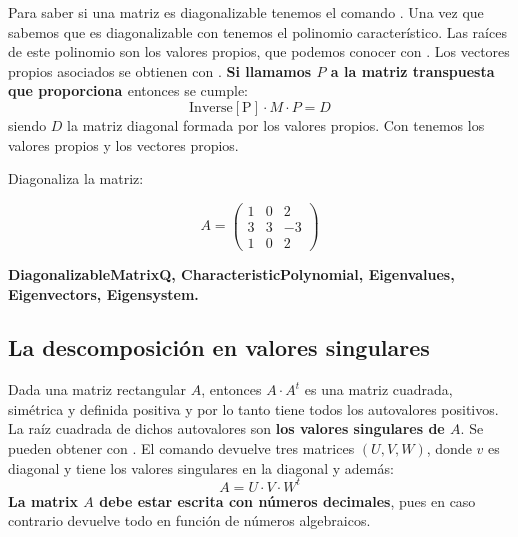 \documentclass[a4paper,10pt, draft]{article}
\newcommand{\com}[1]{\textbf{\color{blue}{#1}}}
\newenvironment{ejer}{\begin{tcolorbox}[center title, title=Ejercicios,
fonttitle=\sffamily\bfseries,colback=blue!5,colframe=orange]}{\end{tcolorbox}}
\newenvironment{funciones}{\begin{tcolorbox}[center title, title=Nuevas funciones, fonttitle=\sffamily\bfseries, colback=green!5!white,colframe=red!75!black]}{\end{tcolorbox}\bigskip}
\begin{document}
Para saber si una matriz es diagonalizable tenemos el comando \com{DiagonalizableMatrixQ[M]}. Una vez que sabemos que es diagonalizable con \com{CharacteristicPolynomial[M,x]}  tenemos el polinomio característico. Las raíces de este polinomio son los valores propios, que podemos conocer con \com{Eigenvalues[M]}. Los vectores propios asociados se obtienen con \com{Eigenvectors[M]}. \textbf{Si llamamos $P$ a la matriz transpuesta que proporciona \com{EigenVectors}} entonces se cumple:
$$
\mathrm{Inverse[P]} \cdot M \cdot P = D
$$
siendo $D$ la matriz diagonal formada por los valores propios. Con \com{Eigensystem[M]} tenemos los valores propios y los vectores propios.


\begin{ejer}
Diagonaliza la matriz:
\vspace{-0.5cm}

$$A=
\begin{pmatrix}
1 & 0 &2\\
3& 3&-3\\
1&0&2
\end{pmatrix}
$$

\end{ejer}  

\enlargethispage{1cm}

\begin{funciones}

\textbf{DiagonalizableMatrixQ, CharacteristicPolynomial, Eigenvalues, Eigenvectors, Eigensystem.}

\end{funciones}


\newpage


\subsection{La descomposición en valores singulares}

Dada una matriz rectangular $A$, entonces $A\cdot A^t$ es una matriz cuadrada, simétrica y definida positiva y por lo tanto tiene todos los autovalores positivos. La raíz cuadrada de dichos autovalores son \textbf{los valores singulares de $A$}. Se pueden obtener con \com{SingularValueList[A]}. El comando \com{SingularValueDecomposition[A]} devuelve tres matrices $(U,V, W)$, donde $v$ es diagonal y tiene los valores singulares en la diagonal y además:
$$
A=U\cdot V\cdot W^t
$$
\textbf{La matrix $A$ debe estar escrita con números decimales}, pues en caso contrario devuelve todo en función de números algebraicos.
\end{document}
